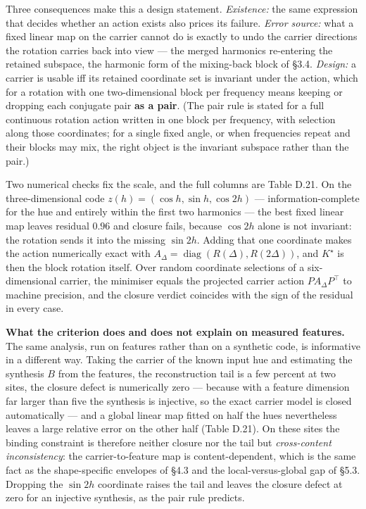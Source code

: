 Three consequences make this a design statement. \textit{Existence:} the same expression that decides whether an action exists also prices its failure. \textit{Error source:} what a fixed linear map on the carrier cannot do is exactly to undo the carrier directions the rotation carries back into view --- the merged harmonics re-entering the retained subspace, the harmonic form of the mixing-back block of \S{}3.4. \textit{Design:} a carrier is usable iff its retained coordinate set is invariant under the action, which for a rotation with one two-dimensional block per frequency means keeping or dropping each conjugate pair \textbf{as a pair}. (The pair rule is stated for a full continuous rotation action written in one block per frequency, with selection along those coordinates; for a single fixed angle, or when frequencies repeat and their blocks may mix, the right object is the invariant subspace rather than the pair.)

Two numerical checks fix the scale, and the full columns are Table D.21. On the three-dimensional code $z(h)=(\cos h,\sin h,\cos 2h)$ --- information-complete for the hue and entirely within the first two harmonics --- the best fixed linear map leaves residual $0.96$ and closure fails, because $\cos2h$ alone is not invariant: the rotation sends it into the missing $\sin2h$. Adding that one coordinate makes the action numerically exact with $A_\Delta=\operatorname{diag}(R(\Delta),R(2\Delta))$, and $K^\star$ is then the block rotation itself. Over random coordinate selections of a six-dimensional carrier, the minimiser equals the projected carrier action $PA_\Delta P^\top$ to machine precision, and the closure verdict coincides with the sign of the residual in every case.

\textbf{What the criterion does and does not explain on measured features.} The same analysis, run on features rather than on a synthetic code, is informative in a different way. Taking the carrier of the known input hue and estimating the synthesis $B$ from the features, the reconstruction tail is a few percent at two sites, the closure defect is numerically zero --- because with a feature dimension far larger than five the synthesis is injective, so the exact carrier model is closed automatically --- and a global linear map fitted on half the hues nevertheless leaves a large relative error on the other half (Table D.21). On these sites the binding constraint is therefore neither closure nor the tail but \textit{cross-content inconsistency}: the carrier-to-feature map is content-dependent, which is the same fact as the shape-specific envelopes of \S{}4.3 and the local-versus-global gap of \S{}5.3. Dropping the $\sin2h$ coordinate raises the tail and leaves the closure defect at zero for an injective synthesis, as the pair rule predicts.

